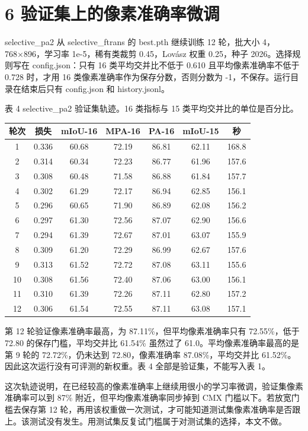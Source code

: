 \documentclass[11pt]{article}
\begin{document}
\section*{6 验证集上的像素准确率微调}
selective\_\allowbreak pa2 从 selective\_\allowbreak ftrans 的 best.pth 继续训练 12 轮，批大小 4，768×896，学习率 1e-5，稀有类裁剪 0.45，Lovász 权重 0.25，种子 2026。选择规则写在 config.json：只有 16 类平均交并比不低于 0.610 且平均像素准确率不低于 0.728 时，才用 16 类像素准确率作为保存分数，否则分数为 -1，不保存。运行目录在结束后只有 config.json 和 history.jsonl。

\begin{small}
表 4  selective\_pa2 验证集轨迹。16 类指标与 15 类平均交并比的单位是百分比。
\end{small}
{\small
\begin{longtable}{ccccccc}
\toprule
轮次 & 损失 & mIoU-16 & MPA-16 & PA-16 & mIoU-15 & 秒 \\
\midrule
\endhead
1 & 0.336 & 60.68 & 72.19 & 86.81 & 62.11 & 168.8 \\
2 & 0.314 & 60.34 & 72.23 & 86.77 & 61.96 & 157.6 \\
3 & 0.308 & 60.48 & 71.58 & 86.88 & 61.84 & 157.7 \\
4 & 0.302 & 61.29 & 72.17 & 86.94 & 62.85 & 156.1 \\
5 & 0.296 & 60.65 & 71.90 & 86.89 & 62.08 & 156.2 \\
6 & 0.297 & 61.30 & 72.56 & 87.07 & 62.90 & 156.6 \\
7 & 0.294 & 61.39 & 72.67 & 87.01 & 63.07 & 155.9 \\
8 & 0.309 & 61.20 & 72.29 & 86.99 & 62.67 & 157.6 \\
9 & 0.313 & 61.52 & 72.72 & 87.08 & 63.11 & 155.6 \\
10 & 0.308 & 61.56 & 72.40 & 87.06 & 63.00 & 156.1 \\
11 & 0.310 & 61.39 & 72.26 & 87.11 & 62.80 & 157.2 \\
12 & 0.306 & 61.54 & 72.55 & 87.11 & 63.08 & 157.1 \\
\bottomrule
\end{longtable}
}
第 12 轮验证像素准确率最高，为 87.11\%，但平均像素准确率只有 72.55\%，低于 72.80 的保存门槛，平均交并比 61.54\% 虽然过了 61.0。平均像素准确率最高的是第 9 轮的 72.72\%，仍未达到 72.80，像素准确率 87.08\%，平均交并比 61.52\%。因此这次运行没有可评测的新权重。表 4 全部是验证集，不能写入表 1。

这次轨迹说明，在已经较高的像素准确率上继续用很小的学习率微调，验证集像素准确率可以到 87\% 附近，但平均像素准确率同步掉到 CMX 门槛以下。若放宽门槛去保存第 12 轮，再用该权重做一次测试，才可能知道测试集像素准确率是否跟上。该测试没有发生。用测试集反复试门槛属于对测试集的选择，本文不做。
\end{document}

